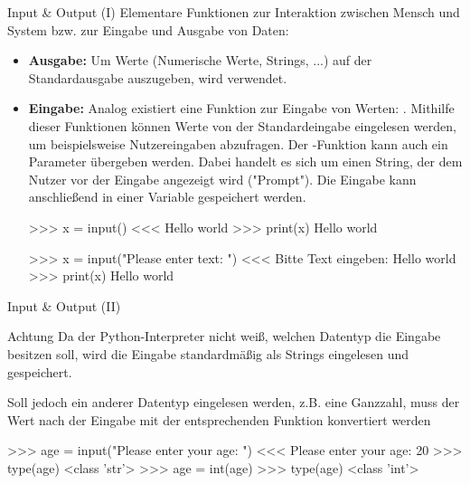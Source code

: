     \begin{frame}[fragile]{Input \& Output (I)}
        Elementare Funktionen zur Interaktion zwischen Mensch und System bzw. zur Eingabe und Ausgabe von Daten:
        
        \begin{itemize}
            \item \textbf{Ausgabe:} Um Werte (Numerische Werte, Strings, ...) auf der Standardausgabe auszugeben, wird  verwendet.
            
            \item \textbf{Eingabe:} Analog existiert eine Funktion zur Eingabe von Werten: . Mithilfe dieser Funktionen können Werte von der Standardeingabe eingelesen werden, um beispielsweise Nutzereingaben abzufragen. Der -Funktion kann auch ein Parameter übergeben werden. Dabei handelt es sich um einen String, der dem Nutzer vor der Eingabe angezeigt wird ("Prompt"). Die Eingabe kann anschließend in einer Variable gespeichert werden.
            
\begin{pyconcode}
>>> x = input()
<<< Hello world
>>> print(x)
Hello world

>>> x = input("Please enter text: ")
<<< Bitte Text eingeben: Hello world
>>> print(x)
Hello world
\end{pyconcode}            
        \end{itemize}
    \end{frame}
    
    \begin{frame}[fragile]{Input \& Output (II)}
        \begin{alertblock}{Achtung}
            Da der Python-Interpreter nicht weiß, welchen Datentyp die Eingabe besitzen soll, wird die Eingabe standardmäßig als Strings eingelesen und gespeichert. 
            
            Soll jedoch ein anderer Datentyp eingelesen werden, z.B. eine Ganzzahl, muss der Wert nach der Eingabe mit der entsprechenden Funktion konvertiert werden
            
\begin{pyconcode}
>>> age = input("Please enter your age: ")
<<< Please enter your age: 20
>>> type(age)
<class 'str'>
>>> age = int(age)
>>> type(age)
<class 'int'>
\end{pyconcode}
        \end{alertblock}
    \end{frame}
    
